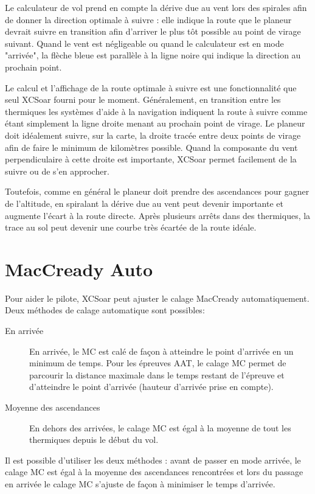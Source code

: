 Le calculateur de vol prend en compte la dérive due au vent lors des spirales afin de donner la direction optimale à suivre : elle indique la route que le planeur devrait suivre en transition afin d'arriver le plus tôt possible au point de virage suivant. Quand le vent est négligeable ou quand le calculateur est en mode "arrivée", la flèche bleue est parallèle à la ligne noire qui indique la direction au prochain point.

Le calcul et l'affichage de la route optimale à suivre est une fonctionnalité que seul XCSoar fourni pour le moment. Généralement, en transition entre les thermiques les systèmes d'aide à la navigation indiquent la route à suivre comme étant simplement la ligne droite menant au prochain point de virage. Le planeur doit idéalement suivre, sur la carte, la droite tracée entre deux points de virage afin de faire le minimum de kilomètres possible. Quand la composante du vent perpendiculaire à cette droite est importante, XCSoar permet facilement de la suivre ou de s'en approcher. 

Toutefois, comme en général le planeur doit prendre des ascendances pour gagner de l'altitude, en spiralant la dérive due au vent peut devenir importante et augmente l'écart à la route directe. Après plusieurs arrêts dans des thermiques, la trace au sol peut devenir une courbe très écartée de la route idéale.

\section{MacCready Auto}\label{sec:auto-maccready}

Pour aider le pilote, XCSoar peut ajuster le calage MacCready automatiquement. Deux méthodes de calage automatique sont possibles:
\begin{description}
\item[En arrivée]  En arrivée, le MC est calé de façon à atteindre le point d'arrivée en un minimum de temps. Pour les épreuves AAT, le calage MC permet de parcourir la distance maximale dans le temps restant de l'épreuve et d'atteindre le point d'arrivée (hauteur d'arrivée prise en compte).
\item[Moyenne des ascendances] En dehors des arrivées, le calage MC est égal à la moyenne de tout les thermiques depuis le début du vol.
\end{description}
Il est possible d'utiliser les deux méthodes : avant de passer en mode arrivée, le calage MC est égal à la moyenne des ascendances rencontrées et lors du passage en arrivée le calage MC s'ajuste de façon à minimiser le temps d'arrivée.

